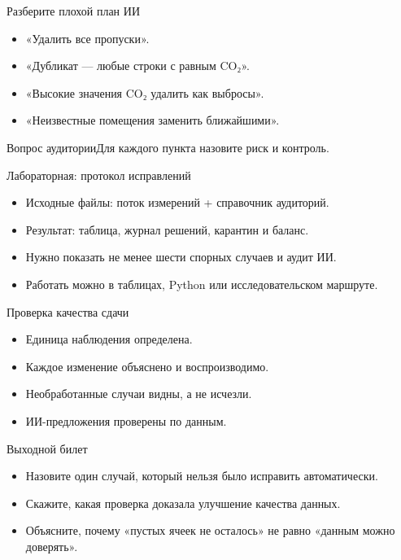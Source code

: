 \documentclass[aspectratio=169,10pt]{beamer}
\begin{document}
\begin{frame}[t]{Разберите плохой план ИИ}
\begin{itemize}
\item «Удалить все пропуски».
\vspace{4pt}
\item «Дубликат — любые строки с равным CO₂».
\vspace{4pt}
\item «Высокие значения CO₂ удалить как выбросы».
\vspace{4pt}
\item «Неизвестные помещения заменить ближайшими».
\vspace{4pt}
\end{itemize}
\vfill\begin{alertblock}{Вопрос аудитории}Для каждого пункта назовите риск и контроль.\end{alertblock}
\end{frame}
\begin{frame}[t]{Лабораторная: протокол исправлений}
\begin{itemize}
\item Исходные файлы: поток измерений + справочник аудиторий.
\vspace{4pt}
\item Результат: таблица, журнал решений, карантин и баланс.
\vspace{4pt}
\item Нужно показать не менее шести спорных случаев и аудит ИИ.
\vspace{4pt}
\item Работать можно в таблицах, Python или исследовательском маршруте.
\vspace{4pt}
\end{itemize}
\end{frame}
\begin{frame}[t]{Проверка качества сдачи}
\begin{itemize}
\item Единица наблюдения определена.
\vspace{4pt}
\item Каждое изменение объяснено и воспроизводимо.
\vspace{4pt}
\item Необработанные случаи видны, а не исчезли.
\vspace{4pt}
\item ИИ-предложения проверены по данным.
\vspace{4pt}
\end{itemize}
\end{frame}
\begin{frame}[t]{Выходной билет}
\begin{itemize}
\item Назовите один случай, который нельзя было исправить автоматически.
\vspace{4pt}
\item Скажите, какая проверка доказала улучшение качества данных.
\vspace{4pt}
\item Объясните, почему «пустых ячеек не осталось» не равно «данным можно доверять».
\vspace{4pt}
\end{itemize}
\end{frame}
\end{document}
